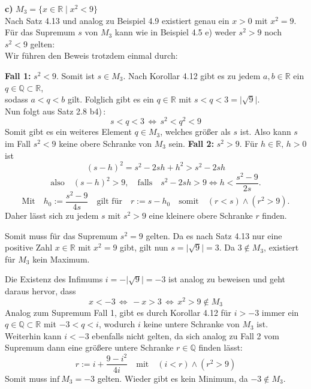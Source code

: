\documentclass[a4paper,graphics,11pt]{article}
\begin{document}
\textbf{c)} $M_3 = \{x \in \mathbb{R} \mid x^2<9\}$\\
Nach Satz 4.13 und analog zu Beispiel 4.9 existiert genau ein $x>0$ mit $x^2 = 9$.\\
Für das Supremum $s$ von $M_3$ kann wie in Beispiel 4.5 e) weder $s^2>9$ noch $s^2<9$ gelten:
\\Wir führen den Beweis trotzdem einmal durch:

\textbf{Fall 1:} $s^2 < 9$. Somit ist $s \in M_3$. Nach Korollar 4.12 gibt es zu jedem
$a,b \in \mathbb{R}$ ein $q \in \mathbb{Q} \subset \mathbb{R}$,\\
sodass $a<q<b$ gilt. Folglich gibt es ein $q \in \mathbb{R}$ mit $s<q<3 = \vert \sqrt{9} \vert$.\\
Nun folgt aus Satz 2.8 b4)\,:
$$ s <q <3 \,\Longleftrightarrow\, s^2<q^2<9$$
Somit gibt es ein weiteres Element $q \in M_3$, welches größer als $s$ ist. Also kann $s$
im Fall $s^2<9$ keine obere Schranke von $M_3$ sein.
\newpage
\textbf{Fall 2:} $s^2>9$. Für $h \in \mathbb{R},\,h>0$ ist
$$(s-h)^2 = s^2 -2sh +h^2 >s^2 -2sh$$
$$
    \text{also}\quad (s-h)^2 > 9,\quad\text{falls}\quad
    s^2-2sh >9 \Longleftrightarrow h<\dfrac{s^2-9}{2s}.
$$
$$
    \text{Mit}\quad h_0 := \dfrac{s^2-9}{4s}\quad\text{gilt für}\quad r:= s-h_0
    \quad\text{somit}\quad(r<s)\land(r^2>9).
$$
Daher lässt sich zu jedem $s$ mit $s^2 > 9$ eine kleinere obere Schranke $r$ finden.

Somit muss für das Supremum $s^2 = 9$ gelten. Da es nach Satz 4.13 nur eine positive
Zahl $x \in \mathbb{R}$ mit $x^2 = 9$ gibt, gilt nun $s = \vert \sqrt{9}\vert = 3$.
Da $3 \notin M_3$, existiert für $M_3$ kein Maximum.

Die Existenz des Infimums  $i = -\vert\sqrt{9}\vert = -3$ ist analog zu beweisen und geht daraus hervor, dass
$$
    x<-3 \,\Longleftrightarrow\,-x > 3 \,\Longleftrightarrow\, x^2>9\notin M_3
$$
Analog zum Supremum Fall 1, gibt es durch Korollar 4.12 für $i>-3$ immer
ein $q \in \mathbb{Q}\subset \mathbb{R}$ mit $-3<q<i$, wodurch $i$ keine untere Schranke von $M_3$ ist.\\
Weiterhin kann $i<-3$ ebenfalls nicht gelten, da sich analog zu Fall 2 vom Supremum dann eine größere untere Schranke $r \in \mathbb{Q}$ finden lässt:
$$
    r:= i + \dfrac{9-i^2}{4i}\quad\text{mit}\quad (i<r) \land (r^2>9)
$$
Somit muss $\text{inf}\ M_3 = -3$ gelten. Wieder gibt es kein Minimum, da $-3 \notin M_3$.\\
\\
\end{document}
